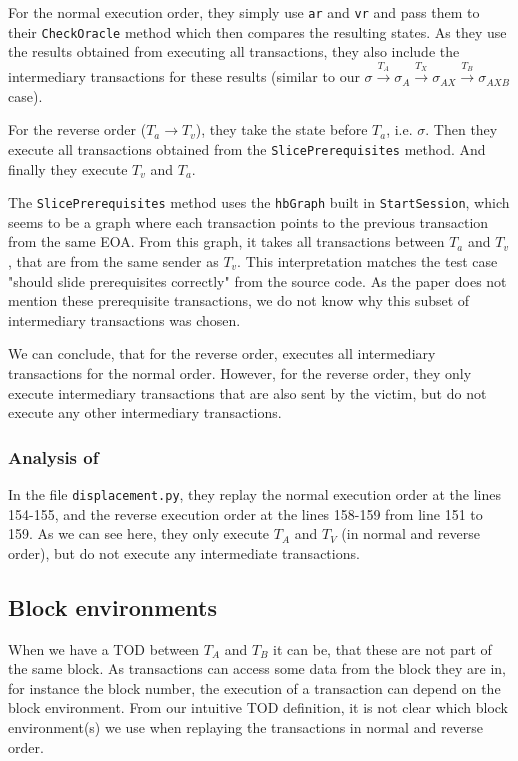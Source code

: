 \documentclass[draft,final]{vutinfth} %
\begin{document}
For the normal execution order, they simply use \verb|ar| and \verb|vr| and pass them to their \verb|CheckOracle| method which then compares the resulting states. As they use the results obtained from executing all transactions, they also include the intermediary transactions for these results (similar to our $\sigma \xrightarrow{T_A} \sigma_A \xrightarrow{T_X} \sigma_{AX} \xrightarrow{T_B} \sigma_{AXB}$ case).

For the reverse order ($T_a \rightarrow T_v$), they take the state before $T_a$, i.e. $\sigma$. Then they execute all transactions obtained from the \verb|SlicePrerequisites| method. And finally they execute $T_v$ and $T_a$.

The \verb|SlicePrerequisites| method uses the \verb|hbGraph| built in \verb|StartSession|, which seems to be a graph where each transaction points to the previous transaction from the same EOA. From this graph, it takes all transactions between $T_a$ and $T_v$, that are from the same sender as $T_v$. This interpretation matches the test case "should slide prerequisites correctly" from the source code. As the paper does not mention these prerequisite transactions, we do not know why this subset of intermediary transactions was chosen.

We can conclude, that for the reverse order, \cite{zhang_combatting_2023} executes all intermediary transactions for the normal order. However, for the reverse order, they only execute intermediary transactions that are also sent by the victim, but do not execute any other intermediary transactions.

\subsubsection{Analysis of \cite{torres_frontrunner_2021}}

In the file \verb|displacement.py|, they replay the normal execution order at the lines 154-155, and the reverse execution order at the lines 158-159 from line 151 to 159. As we can see here, they only execute $T_A$ and $T_V$ (in normal and reverse order), but do not execute any intermediate transactions.

\subsection{Block environments}

When we have a TOD between $T_A$ and $T_B$ it can be, that these are not part of the same block. As transactions can access some data from the block they are in, for instance the block number, the execution of a transaction can depend on the block environment. From our intuitive TOD definition, it is not clear which block environment(s) we use when replaying the transactions in normal and reverse order.
\end{document}

